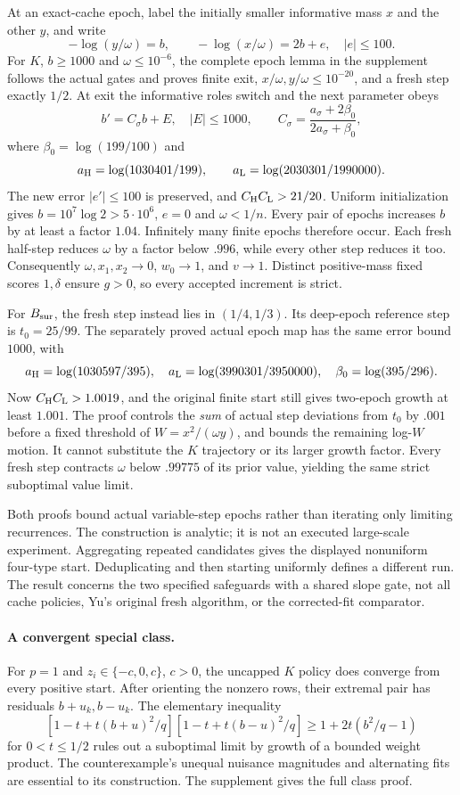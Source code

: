 \documentclass[11pt]{article}
\begin{document}
At an exact-cache epoch, label the initially smaller informative mass $x$ and the other $y$, and write
\[
 -\log(y/\omega)=b,\qquad-\log(x/\omega)=2b+e,\quad |e|\le100.
\]
For $K$, $b\ge1000$ and $\omega\le10^{-6}$, the complete epoch lemma in the supplement follows the actual gates and proves finite exit, $x/\omega,y/\omega\le10^{-20}$, and a fresh step exactly $1/2$. At exit the informative roles switch and the next parameter obeys
\[
 b'=C_\sigma b+E,\quad |E|\le1000,\qquad
 C_\sigma=\frac{a_\sigma+2\beta_0}{2a_\sigma+\beta_0},
\]
where $\beta_0=\log(199/100)$ and
\[
 a_{\rm H}=\log(1030401/199),\qquad
 a_{\rm L}=\log(2030301/1990000).
\]
The new error $|e'|\le100$ is preserved, and $C_{\rm H}C_{\rm L}>21/20$. Uniform initialization gives $b=10^7\log2>5\cdot10^6$, $e=0$ and $\omega<1/n$. Every pair of epochs increases $b$ by at least a factor $1.04$. Infinitely many finite epochs therefore occur. Each fresh half-step reduces $\omega$ by a factor below $.996$, while every other step reduces it too. Consequently $\omega,x_1,x_2\to0$, $w_0\to1$, and $v\to1$. Distinct positive-mass fixed scores $1,\delta$ ensure $g>0$, so every accepted increment is strict.

For $B_{\rm sur}$, the fresh step instead lies in $(1/4,1/3)$. Its deep-epoch reference step is $t_0=25/99$. The separately proved actual epoch map has the same error bound $1000$, with
\[
 a_{\rm H}=\log(1030597/395),\quad
 a_{\rm L}=\log(3990301/3950000),\quad
 \beta_0=\log(395/296).
\]
Now $C_{\rm H}C_{\rm L}>1.0019$, and the original finite start still gives two-epoch growth at least $1.001$. The proof controls the \emph{sum} of actual step deviations from $t_0$ by $.001$ before a fixed threshold of $W=x^2/(\omega y)$, and bounds the remaining log-$W$ motion. It cannot substitute the $K$ trajectory or its larger growth factor. Every fresh step contracts $\omega$ below $.99775$ of its prior value, yielding the same strict suboptimal value limit.

Both proofs bound actual variable-step epochs rather than iterating only limiting recurrences. The construction is analytic; it is not an executed large-scale experiment. Aggregating repeated candidates gives the displayed nonuniform four-type start. Deduplicating and then starting uniformly defines a different run. The result concerns the two specified safeguards with a shared slope gate, not all cache policies, Yu's original fresh algorithm, or the corrected-fit comparator.

\paragraph{A convergent special class.}
For $p=1$ and $z_i\in\{-c,0,c\}$, $c>0$, the uncapped $K$ policy does converge from every positive start. After orienting the nonzero rows, their extremal pair has residuals $b+u_k,b-u_k$. The elementary inequality
\[
 [1-t+t(b+u)^2/q][1-t+t(b-u)^2/q]\ge1+2t(b^2/q-1)
\]
for $0<t\le1/2$ rules out a suboptimal limit by growth of a bounded weight product. The counterexample's unequal nuisance magnitudes and alternating fits are essential to its construction. The supplement gives the full class proof.
\end{document}
